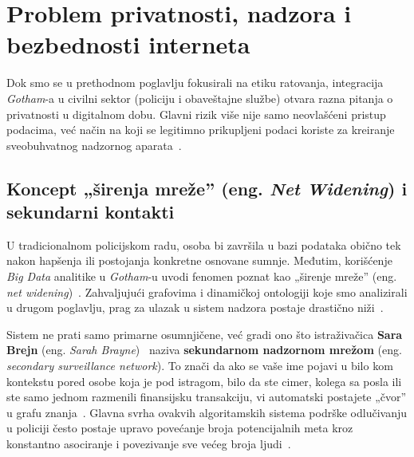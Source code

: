 ﻿\documentclass[12pt]{article}
\begin{document}
\section{Problem privatnosti, nadzora i bezbednosti interneta}

Dok smo se u prethodnom poglavlju fokusirali na etiku ratovanja, integracija \textit{Gotham}-a u civilni sektor (policiju i obaveštajne službe) otvara razna pitanja o privatnosti u digitalnom dobu.
Glavni rizik više nije samo neovlašćeni pristup podacima, već način na koji se legitimno prikupljeni podaci koriste za kreiranje sveobuhvatnog nadzornog aparata~\cite{ulbricht2024palantir}.

\subsection{Koncept „širenja mreže” (eng. \textit{Net Widening}) i sekundarni kontakti}

U tradicionalnom policijskom radu, osoba bi završila u bazi podataka obično tek nakon hapšenja ili postojanja konkretne osnovane sumnje.
Međutim, korišćenje \textit{Big Data} analitike u \textit{Gotham}-u uvodi fenomen poznat kao „širenje mreže” (eng. \textit{net widening})~\cite{brayne2017big}.
Zahvaljujući grafovima i dinamičkoj ontologiji koje smo analizirali u drugom poglavlju, prag za ulazak u sistem nadzora postaje drastično niži~\cite{architecture2024}.

Sistem ne prati samo primarne osumnjičene, već gradi ono što istraživačica \textbf{Sara Brejn} (eng. \textit{Sarah Brayne})~\cite{brayne2017big} naziva \textbf{sekundarnom nadzornom mrežom} (eng. \textit{secondary surveillance network}).
To znači da ako se vaše ime pojavi u bilo kom kontekstu pored osobe koja je pod istragom, bilo da ste cimer, kolega sa posla ili ste samo jednom razmenili finansijsku transakciju, vi automatski postajete „čvor” u grafu znanja~\cite{architecture2024}.
Glavna svrha ovakvih algoritamskih sistema podrške odlučivanju u policiji često postaje upravo povećanje broja potencijalnih meta kroz konstantno asociranje i povezivanje sve većeg broja ljudi~\cite{ulbricht2024palantir}.
\end{document}
